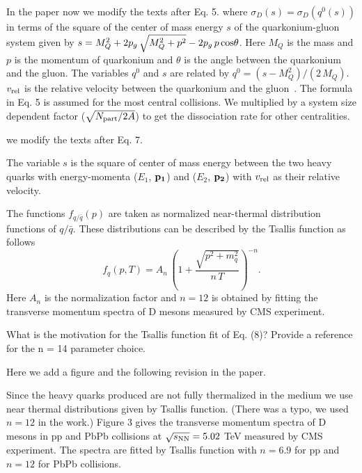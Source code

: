 \documentclass[a4paper,11pt]{article}
\begin{document}
{\color{blue}  In the paper now we modify the texts after Eq. 5. 
where $\sigma_{D}(s) = \sigma_{D}(q^0(s))$ in terms of the square of the center of
mass energy $s$ of the quarkonium-gluon system given by
$s=M_{Q}^{2} + 2  p_g \, \sqrt{M_{Q}^2 + p^2} - 2  p_g \, p \, {\rm cos\theta}$.
Here $M_{Q}$ is the mass and $p$ is the momentum of quarkonium and $\theta$ is the angle
between the quarkonium and the gluon.
  The variables $q^0$ and $s$ are related by $q^{0} = (s-M_{Q}^{2})/(2\,M_{Q})$. 
$v_{\rm rel}$ is the relative velocity between the quarkonium and the gluon~\cite{Kumar:2014kfa}.
  The formula in Eq. 5 is assumed
for the most central collisions. We multiplied by a system size dependent factor
($\sqrt{N_{\rm part}/2A}$) to get the dissociation rate for other centralities. \newline

we modify the texts after Eq. 7. \newline

The variable $s$ is the square of center of mass energy between the two heavy quarks with
energy-momenta ($E_1$, ${\rm\bf p_1}$) and ($E_2$, ${\rm\bf p_2}$) with $v_{\rm rel}$ as their
relative velocity.

The functions $f_{q/\bar{q}}(p)$ are taken as normalized near-thermal distribution functions
of $q/\bar{q}$. These distributions can be described by the Tsallis
function as follows 
\begin{equation}
f_{q} (p,T) = A_{n}\,\left( 1+\frac{ \sqrt{p^2+m_q^2} }{n \,T} \right)^{-n}.
\end{equation}
Here $A_n$ is the normalization factor and $n=12$ is obtained by fitting the
transverse momentum spectra of D mesons measured by CMS experiment.
}

What is the motivation for the Tsallis function fit of Eq. (8)? Provide 
a reference for the n = 14 parameter choice. 

{\color{blue} Here we add a figure and the following revision in the paper.

  Since the heavy quarks produced are not fully thermalized in the medium
  we use near thermal distributions given by Tsallis function.
  (There was a typo, we used $n=12$ in the work.)
  Figure 3 gives the transverse momentum spectra of D mesons in pp and PbPb collisions
  at $\sqrt{s_{\rm NN}}=5.02$ TeV measured by CMS experiment. The spectra are fitted
  by Tsallis function with $n=6.9$ for pp and $n=12$ for PbPb collisions.
}
\end{document}
